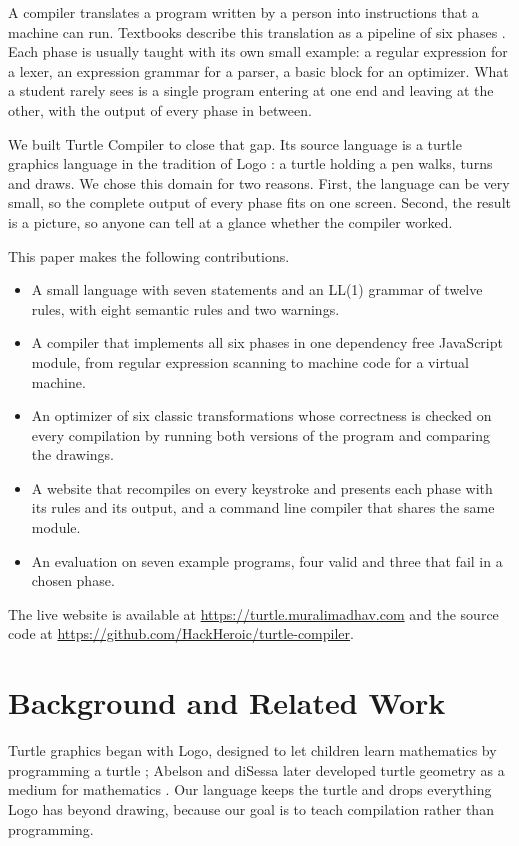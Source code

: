 \documentclass[conference]{IEEEtran}
\begin{document}
A compiler translates a program written by a person into instructions that a machine can run. Textbooks describe this translation as a pipeline of six phases \cite{aho2006,cooper2011}. Each phase is usually taught with its own small example: a regular expression for a lexer, an expression grammar for a parser, a basic block for an optimizer. What a student rarely sees is a single program entering at one end and leaving at the other, with the output of every phase in between.

We built Turtle Compiler to close that gap. Its source language is a turtle graphics language in the tradition of Logo \cite{papert1980,abelson1981}: a turtle holding a pen walks, turns and draws. We chose this domain for two reasons. First, the language can be very small, so the complete output of every phase fits on one screen. Second, the result is a picture, so anyone can tell at a glance whether the compiler worked.

This paper makes the following contributions.
\begin{itemize}
\item A small language with seven statements and an LL(1) grammar of twelve rules, with eight semantic rules and two warnings.
\item A compiler that implements all six phases in one dependency free JavaScript module, from regular expression scanning to machine code for a virtual machine.
\item An optimizer of six classic transformations whose correctness is checked on every compilation by running both versions of the program and comparing the drawings.
\item A website that recompiles on every keystroke and presents each phase with its rules and its output, and a command line compiler that shares the same module.
\item An evaluation on seven example programs, four valid and three that fail in a chosen phase.
\end{itemize}

The live website is available at \url{https://turtle.muralimadhav.com} and the source code at \url{https://github.com/HackHeroic/turtle-compiler}.

\section{Background and Related Work}

Turtle graphics began with Logo, designed to let children learn mathematics by programming a turtle \cite{papert1980}; Abelson and diSessa later developed turtle geometry as a medium for mathematics \cite{abelson1981}. Our language keeps the turtle and drops everything Logo has beyond drawing, because our goal is to teach compilation rather than programming.
\end{document}
